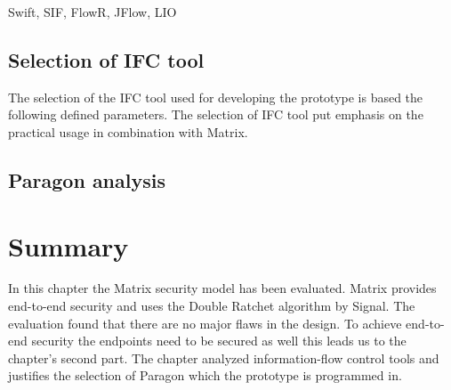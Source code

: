 Swift, SIF, FlowR, JFlow, LIO


\subsection{Selection of IFC tool}
The selection of the IFC tool used for developing the prototype is based the following defined parameters.
The selection of IFC tool put emphasis on the practical usage in combination with Matrix. 

\subsection{Paragon analysis}


\section{Summary}
In this chapter the Matrix security model has been evaluated. Matrix provides end-to-end security and uses the Double Ratchet algorithm by Signal. The evaluation found that there are no major flaws in the design. To achieve end-to-end security the endpoints need to be secured as well \cite{Sabelfeld2003} this leads us to the chapter's second part. The chapter analyzed information-flow control tools and justifies the selection of Paragon which the prototype is programmed in. 